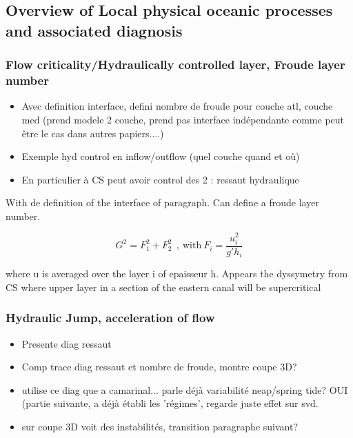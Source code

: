 \subsection{Overview of Local physical oceanic processes and associated diagnosis}


\subsubsection{Flow criticality/Hydraulically controlled layer, Froude layer number}

\begin{itemize}
\item Avec definition interface, defini nombre de froude pour couche atl, couche med (prend modele 2 couche, prend pas interface indépendante comme peut être le cas dans autres papiers....)
\item Exemple hyd control en inflow/outflow (quel couche quand et où)
\item En particulier à CS peut avoir control des 2 : ressaut hydraulique
\end{itemize}

With de definition of the interface of paragraph. Can define a froude layer number. 

\begin{equation}
G^2=F_1^2+F_2^2 \ \ , \ \text{with} \ F_i=\frac{u_i^2}{g'h_i}
\end{equation}

where u is averaged over the layer i of epaisseur h. Appears the dyssymetry from CS where upper layer in a section of the eastern canal will be supercritical

\subsubsection{Hydraulic Jump, acceleration of flow}

\begin{itemize}
\item Presente diag ressaut
\item Comp trace diag ressaut et nombre de froude, montre coupe 3D?
\item utilise ce diag que a camarinal... parle déjà variabilité neap/spring tide? OUI (partie suivante, a déjà établi les 'régimes', regarde juste effet sur svd.
\item sur coupe 3D voit des instabilités, transition paragraphe suivant?
\end{itemize}

